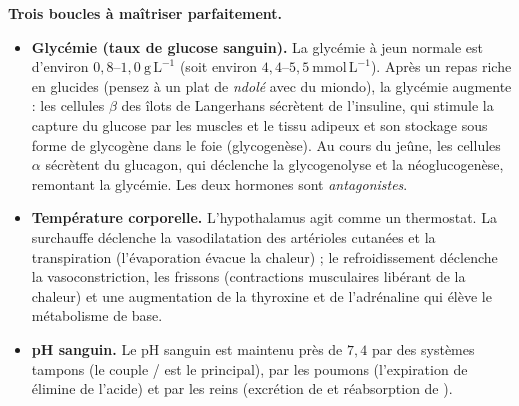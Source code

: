 \documentclass[11pt]{article}
\newcommand{\cle}[1]{{\popxbold\color{popdark}#1}}
\begin{document}
\textbf{Trois boucles à maîtriser parfaitement.}

\begin{itemize}
\item \textbf{Glycémie (taux de glucose sanguin).} La glycémie à jeun normale est d'environ $0,8$--$1,0\ \mathrm{g\,L^{-1}}$ (soit environ $4,4$--$5,5\ \mathrm{mmol\,L^{-1}}$). Après un repas riche en glucides (pensez à un plat de \emph{ndolé} avec du miondo), la glycémie augmente : les cellules $\beta$ des îlots de Langerhans sécrètent de l'\cle{insuline}, qui stimule la capture du glucose par les muscles et le tissu adipeux et son stockage sous forme de glycogène dans le foie (glycogenèse). Au cours du jeûne, les cellules $\alpha$ sécrètent du \cle{glucagon}, qui déclenche la glycogenolyse et la néoglucogenèse, remontant la glycémie. Les deux hormones sont \emph{antagonistes}.
\item \textbf{Température corporelle.} L'hypothalamus agit comme un thermostat. La surchauffe déclenche la vasodilatation des artérioles cutanées et la transpiration (l'évaporation évacue la chaleur) ; le refroidissement déclenche la vasoconstriction, les frissons (contractions musculaires libérant de la chaleur) et une augmentation de la thyroxine et de l'adrénaline qui élève le métabolisme de base.
\item \textbf{pH sanguin.} Le pH sanguin est maintenu près de $7,4$ par des systèmes tampons (le couple / est le principal), par les poumons (l'expiration de  élimine de l'acide) et par les reins (excrétion de  et réabsorption de ).
\end{itemize}
\end{document}
